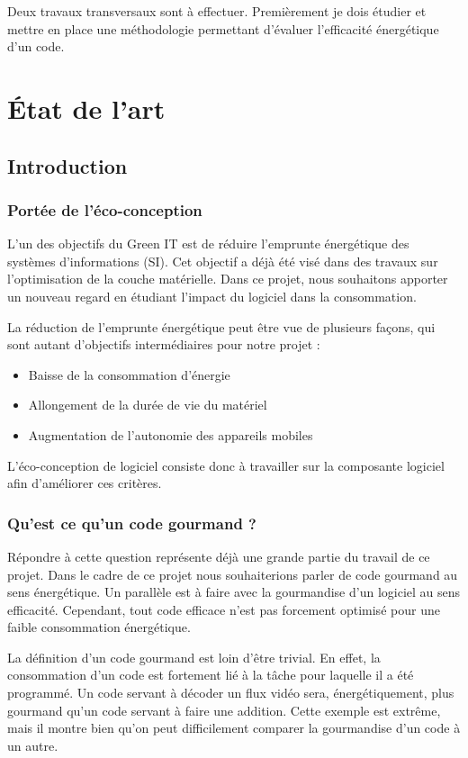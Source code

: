 \documentclass[a4paper, 11pt]{report}
\begin{document}
Deux travaux transversaux sont à effectuer. Premièrement je dois étudier et mettre en place une méthodologie permettant d'évaluer l'efficacité énergétique d'un code.

\chapter{État de l'art}
\section{Introduction}
\subsection{Portée de l'éco-conception}
L’un des objectifs du Green IT est de réduire l’emprunte énergétique des systèmes d’informations (SI). Cet objectif a déjà été visé dans des travaux sur l'optimisation de la couche matérielle. Dans ce projet, nous souhaitons apporter un nouveau regard en étudiant l’impact du logiciel dans la consommation.

La réduction de l’emprunte énergétique peut être vue de plusieurs façons, qui sont autant d’objectifs intermédiaires pour notre projet :
\begin{itemize}
	\item Baisse de la consommation d’énergie
	\item Allongement de la durée de vie du matériel
	\item Augmentation de l’autonomie des appareils mobiles
\end{itemize}

L’éco-conception de logiciel consiste donc à travailler sur la composante logiciel afin d’améliorer ces critères.

\subsection{Qu'est ce qu'un code gourmand ?}
Répondre à cette question représente déjà une grande partie du travail de ce projet. Dans le cadre de ce projet nous souhaiterions parler de code gourmand au sens énergétique. Un parallèle est à faire avec la gourmandise d’un logiciel au sens efficacité. Cependant, tout code efficace n’est pas forcement optimisé pour une faible consommation énergétique.

La définition d’un code gourmand est loin d’être trivial. En effet, la consommation d’un code est fortement lié à la tâche pour laquelle il a été programmé. Un code servant à décoder un flux vidéo sera, énergétiquement, plus gourmand qu’un code servant à faire une addition. Cette exemple est extrême, mais il montre bien qu’on peut difficilement comparer la gourmandise d’un code à un autre.
\end{document}
